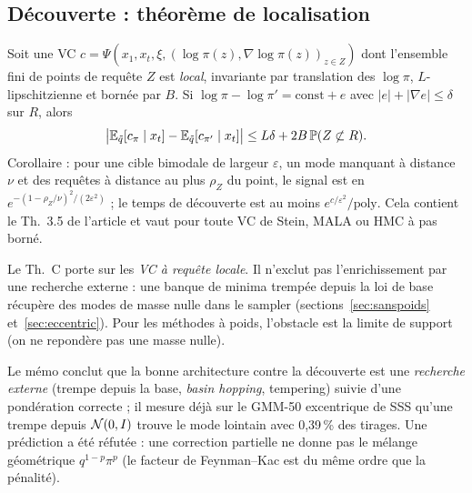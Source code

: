 \subsection{Découverte : théorème de localisation}
\begin{theorem}
Soit une VC $c=\Psi(x_1,x_t,\xi,(\log\pi(z),\nabla\log\pi(z))_{z\in Z})$ dont l'ensemble fini de points de requête $Z$ est \emph{local}, invariante par translation des $\log\pi$, $L$-lipschitzienne et bornée par $B$. Si $\log\pi-\log\pi'=\mathrm{const}+e$ avec $|e|+|\nabla e|\le\delta$ sur $R$, alors
\[
  \big|\mathbb{E}_{\tilde q}[c_\pi\mid x_t]-\mathbb{E}_{\tilde q}[c_{\pi'}\mid x_t]\big|\le L\delta+2B\,\mathbb P(Z\not\subset R).
\]
Corollaire : pour une cible bimodale de largeur $\varepsilon$, un mode manquant à distance $\nu$ et des requêtes à distance au plus $\rho_Z$ du point, le signal est en $e^{-(1-\rho_Z/\nu)^2/(2\varepsilon^2)}$ ; le temps de découverte est au moins $e^{c/\varepsilon^2}/\mathrm{poly}$. Cela contient le Th.~3.5 de l'article et vaut pour toute VC de Stein, MALA ou HMC à pas borné.
\end{theorem}
\begin{remark}
Le Th.~C porte sur les \emph{VC à requête locale}. Il n'exclut pas l'enrichissement par une recherche externe : une banque de minima trempée depuis la loi de base récupère des modes de masse nulle dans le sampler (sections~\ref{sec:sanspoids} et~\ref{sec:eccentric}). Pour les méthodes à poids, l'obstacle est la limite de support (on ne repondère pas une masse nulle).
\end{remark}
Le mémo conclut que la bonne architecture contre la découverte est une \emph{recherche externe} (trempe depuis la base, \emph{basin hopping}, tempering) suivie d'une pondération correcte ; il mesure déjà sur le GMM-50 excentrique de SSS qu'une trempe depuis $\mathcal{N}(0,I)$ trouve le mode lointain avec 0,39\,\% des tirages. Une prédiction a été réfutée : une correction partielle ne donne pas le mélange géométrique $q^{1-p}\pi^p$ (le facteur de Feynman--Kac est du même ordre que la pénalité).

